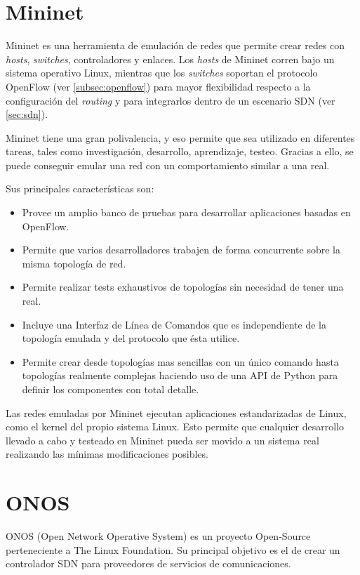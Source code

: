 \section{Mininet}
\label{sec:mininet}

Mininet es una herramienta de emulación de redes que permite crear redes con \textit{hosts}, \textit{switches}, controladores y enlaces. Los \textit{hosts} de Mininet corren bajo un sistema operativo Linux, mientras que los \textit{switches} soportan el protocolo OpenFlow (ver \ref{subsec:openflow}) para mayor flexibilidad respecto a la configuración del \textit{routing} y para integrarlos dentro de un escenario SDN (ver \ref{sec:sdn}).

Mininet tiene una gran polivalencia, y eso permite que sea utilizado en diferentes tareas, tales como investigación, desarrollo, aprendizaje, testeo. Gracias a ello, se puede conseguir emular una red con un comportamiento similar a una real.

Sus principales características son:
\begin{itemize}
	\item Provee un amplio banco de pruebas para desarrollar aplicaciones basadas en OpenFlow.
	\item Permite que varios desarrolladores trabajen de forma concurrente sobre la misma topología de red.
	\item Permite realizar tests exhaustivos de topologías sin necesidad de tener una real.
	\item Incluye una Interfaz de Línea de Comandos que es independiente de la topología emulada y del protocolo que ésta utilice.
	\item Permite crear desde topologías mas sencillas con un único comando hasta topologías realmente complejas haciendo uso de una API de Python para definir los componentes con total detalle.
\end{itemize}

Las redes emuladas por Mininet ejecutan aplicaciones estandarizadas de Linux, como el kernel del propio sistema Linux. Esto permite que cualquier desarrollo llevado a cabo y testeado en Mininet pueda ser movido a un sistema real realizando las mínimas modificaciones posibles.

\section{ONOS}
\label{sec:onos}

ONOS (Open Network Operative System) es un proyecto Open-Source perteneciente a The Linux Foundation. Su principal objetivo es el de crear un controlador SDN para proveedores de servicios de comunicaciones.

